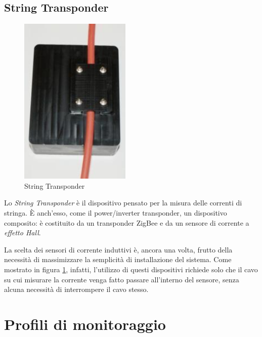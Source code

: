 \subsection{String Transponder}
%
\begin{figure}[!h]
\centering
\includegraphics[width=150pt]{img/string-transponder.jpg}
\caption{String Transponder}
\label{string-transponder}
\end{figure}
%
Lo \emph{String Transponder} \`e il dispositivo pensato per la misura delle correnti 
di stringa. \`E anch'esso, come il power/inverter transponder, un dispositivo composito:
\`e costituito da un transponder ZigBee e da un sensore di corrente a \emph{effetto Hall}.
%

%
La scelta dei sensori di corrente induttivi \`e, ancora una volta, frutto della 
necessit\`a di massimizzare la semplicit\`a di installazione del sistema. 
%
Come mostrato in figura \ref{string-transponder}, infatti, l'utilizzo di questi dispositivi
richiede solo che il cavo su cui misurare la corrente venga fatto passare all'interno 
del sensore, senza alcuna necessit\`a di interrompere il cavo stesso.
%

%
\section{Profili di monitoraggio}
